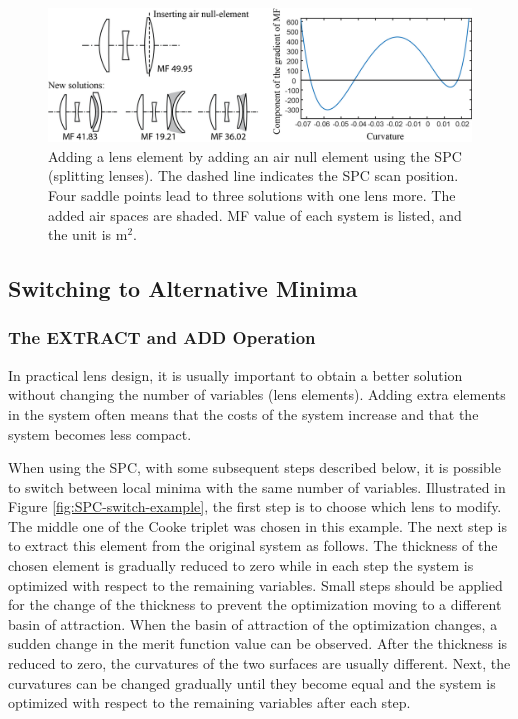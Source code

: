 \begin{figure}[h!]
    \centering
    \includegraphics[scale=0.68]{chapter-2/figures/spc_add_air.png}
    \caption{Adding a lens element by adding an air null element using the SPC (splitting lenses). The dashed line indicates the SPC scan position. Four saddle points lead to three solutions with one lens more. The added air spaces are shaded. MF value of each system is listed, and the unit is \textmu m$^2$. }
    \label{fig:SPC-air null element}
\end{figure}

\label{cp2-switching}
\subsection{Switching to Alternative Minima}

\subsubsection{The EXTRACT and ADD Operation}
In practical lens design, it is usually important to obtain a better solution without changing the number of variables (lens elements). Adding extra elements in the system often means that the costs of the system increase and that the system becomes less compact. 

When using the SPC, with some subsequent steps described below, it is possible to switch between local minima with the same number of variables. Illustrated in Figure \ref{fig:SPC-switch-example}, the first step is to choose which lens to modify. The middle one of the Cooke triplet was chosen in this example. The next step is to extract this element from the original system as follows. The thickness of the chosen element is gradually reduced to zero while in each step the system is optimized with respect to the remaining variables. Small steps should be applied for the change of the thickness to prevent the optimization moving to a different basin of attraction. When the basin of attraction of the optimization changes, a sudden change in the merit function value can be observed. After the thickness is reduced to zero, the curvatures of the two surfaces are usually different. Next, the curvatures can be changed gradually until they become equal and the system is optimized with respect to the remaining variables after each step. 

